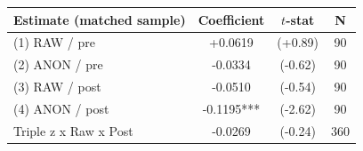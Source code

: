 \begin{tabular}{lccc}
\toprule
Estimate (matched sample) & Coefficient & $t$-stat & N \\
\midrule
(1) RAW / pre & +0.0619 & (+0.89) & 90 \\
(2) ANON / pre & -0.0334 & (-0.62) & 90 \\
(3) RAW / post & -0.0510 & (-0.54) & 90 \\
(4) ANON / post & -0.1195*** & (-2.62) & 90 \\
Triple z x Raw x Post & -0.0269 & (-0.24) & 360 \\
\bottomrule
\end{tabular}